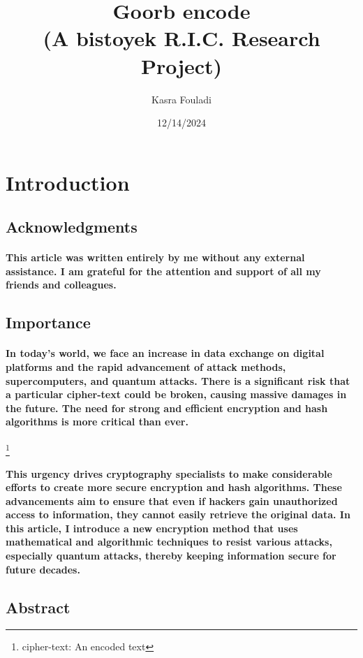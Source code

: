 \documentclass[oneside]{book}
\newcommand{\myparagraph}[1]{\paragraph{\textnormal{#1}}}
\begin{document}
\title{Goorb encode\\(A bistoyek R.I.C. Research Project)}
\author{Kasra Fouladi}
\date{12/14/2024}

\maketitle

\frontmatter
\tableofcontents
\mainmatter

\small

\section{Introduction}

\subsection{Acknowledgments}

\myparagraph{
This article was written entirely by me without any external assistance. I am grateful for the attention and support of all my friends and colleagues.
}

\subsection{Importance}

\myparagraph{
In today’s world, we face an increase in data exchange on digital platforms and the rapid advancement of attack methods, supercomputers, and quantum attacks. There is a significant risk that a particular cipher-text could be broken, causing massive damages in the future. The need for strong and efficient encryption and hash algorithms is more critical than ever.
}
\footnote{cipher-text: An encoded text}

\myparagraph{
This urgency drives cryptography specialists to make considerable efforts to create more secure encryption and hash algorithms. These advancements aim to ensure that even if hackers gain unauthorized access to information, they cannot easily retrieve the original data. In this article, I introduce a new encryption method that uses mathematical and algorithmic techniques to resist various attacks, especially quantum attacks, thereby keeping information secure for future decades.
}

\subsection{Abstract}
\end{document}
